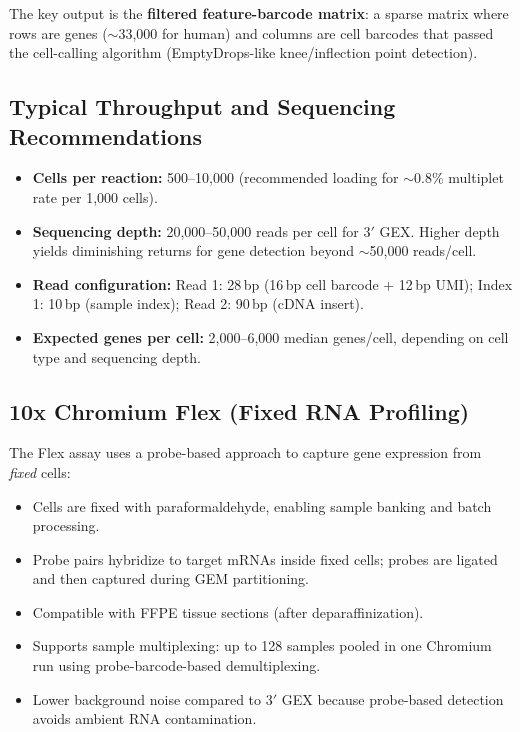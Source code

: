 The key output is the \textbf{filtered feature-barcode matrix}: a sparse
matrix where rows are genes ($\sim$33,000 for human) and columns are cell
barcodes that passed the cell-calling algorithm (EmptyDrops-like knee/inflection
point detection).

\subsection{Typical Throughput and Sequencing Recommendations}

\begin{itemize}[nosep]
  \item \textbf{Cells per reaction:} 500--10,000 (recommended loading for
    $\sim$0.8\% multiplet rate per 1,000 cells).
  \item \textbf{Sequencing depth:} 20,000--50,000 reads per cell for 3$'$ GEX.
    Higher depth yields diminishing returns for gene detection beyond
    $\sim$50,000 reads/cell.
  \item \textbf{Read configuration:} Read 1: 28\,bp (16\,bp cell barcode +
    12\,bp UMI); Index 1: 10\,bp (sample index); Read 2: 90\,bp (cDNA insert).
  \item \textbf{Expected genes per cell:} 2,000--6,000 median genes/cell,
    depending on cell type and sequencing depth.
\end{itemize}

\subsection{10x Chromium Flex (Fixed RNA Profiling)}

The Flex assay uses a probe-based approach to capture gene expression from
\emph{fixed} cells:

\begin{itemize}[nosep]
  \item Cells are fixed with paraformaldehyde, enabling sample banking and
    batch processing.
  \item Probe pairs hybridize to target mRNAs inside fixed cells; probes are
    ligated and then captured during GEM partitioning.
  \item Compatible with FFPE tissue sections (after deparaffinization).
  \item Supports sample multiplexing: up to 128 samples pooled in one Chromium
    run using probe-barcode-based demultiplexing.
  \item Lower background noise compared to 3$'$ GEX because probe-based
    detection avoids ambient RNA contamination.
\end{itemize}


